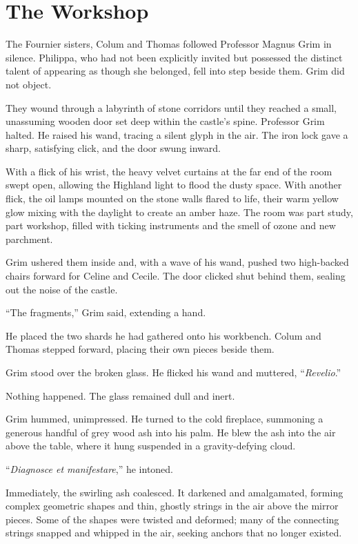 \section*{The Workshop}
 
The Fournier sisters, Colum and Thomas followed Professor Magnus Grim in silence. Philippa, who had not been explicitly invited but possessed the distinct talent of appearing as though she belonged, fell into step beside them. Grim did not object.
 
They wound through a labyrinth of stone corridors until they reached a small, unassuming wooden door set deep within the castle's spine. Professor Grim halted. He raised his wand, tracing a silent glyph in the air. The iron lock gave a sharp, satisfying click, and the door swung inward.
 
With a flick of his wrist, the heavy velvet curtains at the far end of the room swept open, allowing the Highland light to flood the dusty space. With another flick, the oil lamps mounted on the stone walls flared to life, their warm yellow glow mixing with the daylight to create an amber haze. The room was part study, part workshop, filled with ticking instruments and the smell of ozone and new parchment.
 
Grim ushered them inside and, with a wave of his wand, pushed two high-backed chairs forward for Celine and Cecile. The door clicked shut behind them, sealing out the noise of the castle.
 
\enquote{The fragments,} Grim said, extending a hand.
 
He placed the two shards he had gathered onto his workbench. Colum and Thomas stepped forward, placing their own pieces beside them.
 
Grim stood over the broken glass. He flicked his wand and muttered, \enquote{\textit{Revelio}.}
 
Nothing happened. The glass remained dull and inert.
 
Grim hummed, unimpressed. He turned to the cold fireplace, summoning a generous handful of grey wood ash into his palm. He blew the ash into the air above the table, where it hung suspended in a gravity-defying cloud.
 
\enquote{\textit{Diagnosce et manifestare},} he intoned.
 
Immediately, the swirling ash coalesced. It darkened and amalgamated, forming complex geometric shapes and thin, ghostly strings in the air above the mirror pieces. Some of the shapes were twisted and deformed; many of the connecting strings snapped and whipped in the air, seeking anchors that no longer existed.
 
